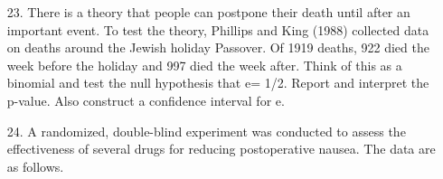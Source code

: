 \documentclass[10pt]{extarticle}
\begin{document}
\begin{itemize}
	\item[23.] There is a theory that people can postpone their death until after an important event. To test the theory, Phillips and King (1988) collected data on deaths around the Jewish holiday Passover. Of 1919 deaths, 922 died the week before the holiday and 997 died the week after. Think of this as a binomial and test the null hypothesis that e= 1/2. Report and interpret the p-value. Also construct a confidence interval for e. \\ 

	\item[24.] A randomized, double-blind experiment was conducted to assess the effectiveness of several drugs for reducing postoperative nausea. The data are as follows. \\ 

\end{itemize} 

\hfill 
\end{document}

